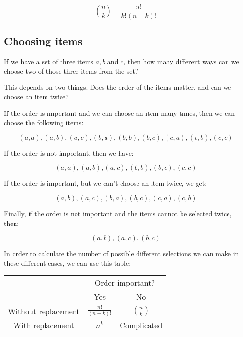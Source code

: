 \begin{dmath*}
	{n \choose k} = \frac{n!}{k!(n-k)!}
\end{dmath*}

\subsection{Choosing items}

If we have a set of three items $a, b$ and $c$, then how many different ways can
we choose two of those three items from the set?

This depends on two things. Does the order of the items matter, and can we
choose an item twice?

If the order is important and we can choose an item many times, then we can
choose the following items:

\begin{dmath*}
	(a,a), (a,b), (a,c), (b,a), (b,b), (b,c), (c,a), (c,b), (c,c)
\end{dmath*}

If the order is not important, then we have:

\begin{dmath*}
	(a,a), (a,b), (a,c), (b,b), (b,c), (c,c)
\end{dmath*}

If the order is important, but we can't choose an item twice, we get:

\begin{dmath*}
	(a,b), (a,c), (b,a), (b,c), (c,a), (c,b)
\end{dmath*}

Finally, if the order is not important and the items cannot be selected twice,
then:

\begin{dmath*}
	(a,b), (a,c), (b,c)
\end{dmath*}

In order to calculate the number of possible different selections we can make in
these different cases, we can use this table:

\begin{center}
\begin{tabular}{|c|c|c|}
	\hline
	& \multicolumn{2}{c|}{Order important?}\\
	\cline{2-3}
	& Yes & No\\ \hline
	Without replacement & $\frac{n!}{(n-k)!}$ & $n \choose k$\\ \hline
	With replacement & $n^k$ & Complicated\\ \hline
\end{tabular}
\end{center}

